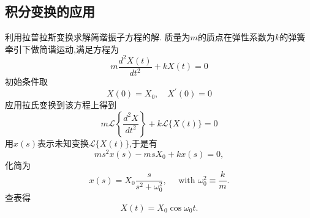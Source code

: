 \subsection{积分变换的应用}
\label{subsec:applications}

\begin{examplebox}{利用拉普拉斯变换求解简谐振子方程的解.}
    质量为$m$的质点在弹性系数为$k$的弹簧牵引下做简谐运动,满足方程为
    $$
m \frac{d^2 X(t)}{d t^2}+k X(t)=0
$$
初始条件取
$$
X(0)=X_0, \quad X^{\prime}(0)=0
$$
应用拉氏变换到该方程上得到
$$
m \mathcal{L}\left\{\frac{d^2 X}{d t^2}\right\}+k \mathcal{L}\{X(t)\}=0
$$
用$x(s)$表示未知变换$\mathcal{L}\{ X(t)\}$,于是有
$$
m s^2 x(s)-m s X_0+k x(s)=0 ,
$$
化简为
$$
x(s)=X_0 \frac{s}{s^2+\omega_0^2}, \quad \text { with } \omega_0^2 \equiv \frac{k}{m} .
$$
查表得
$$
X(t)=X_0 \cos \omega_0 t .
$$
\end{examplebox}